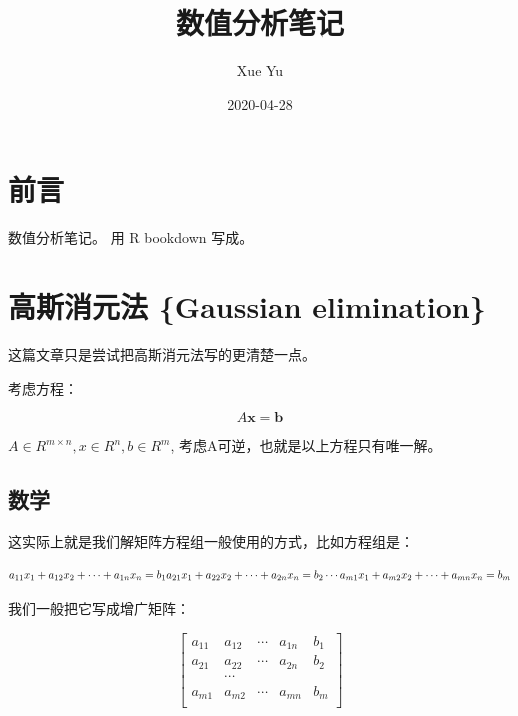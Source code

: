 \documentclass[
]{book}
\title{数值分析笔记}
\author{Xue Yu}
\date{2020-04-28}
\begin{document}
\maketitle

{
\setcounter{tocdepth}{1}
\tableofcontents
}
\hypertarget{ux524dux8a00}{%
\chapter*{前言}\label{ux524dux8a00}}

数值分析笔记。
用 R bookdown 写成。

\hypertarget{ux9ad8ux65afux6d88ux5143ux6cd5-gaussian-elimination}{%
\chapter{高斯消元法 \{Gaussian elimination\}}\label{ux9ad8ux65afux6d88ux5143ux6cd5-gaussian-elimination}}

这篇文章只是尝试把高斯消元法写的更清楚一点。

考虑方程：

\[
A \mathbf{x} = \mathbf{b}
\]

\(A \in R^{m \times n}, x \in R^n, b \in R^m\), 考虑A可逆，也就是以上方程只有唯一解。

\hypertarget{ux6570ux5b66}{%
\section{数学}\label{ux6570ux5b66}}

这实际上就是我们解矩阵方程组一般使用的方式，比如方程组是：

\[
a_{11}x_1 + a_{12}x_2 + \cdots + a_{1n}x_n = b_1 \\
a_{21}x_1 + a_{22}x_2 + \cdots + a_{2n}x_n = b_2 \\
\cdots \\
a_{m1}x_1 + a_{m2}x_2 + \cdots + a_{mn}x_n = b_m \\
\]

我们一般把它写成增广矩阵：

\[
\begin{bmatrix}
a_{11} & a_{12} &  \cdots &  a_{1n} & b_1 \\
a_{21} & a_{22} &  \cdots &  a_{2n} & b_2 \\
       &      \cdots    &      \\   
a_{m1} & a_{m2} &  \cdots &  a_{mn} & b_m \\
\end{bmatrix}
\]
\end{document}
